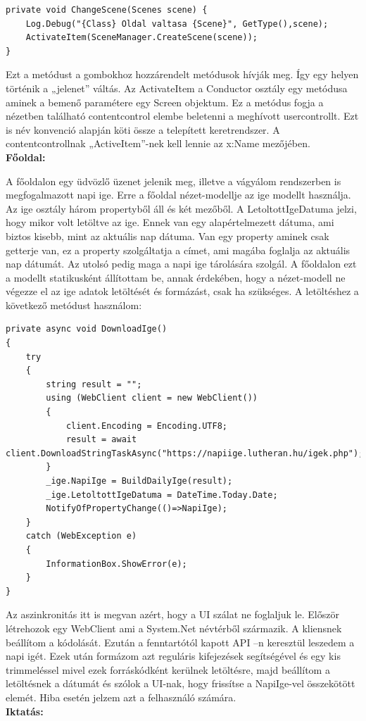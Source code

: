 \documentclass[
]{thesis-ekf}
\theoremstyle{definition}
\theoremstyle{remark}
\begin{document}
\begin{lstlisting}
private void ChangeScene(Scenes scene) {
	Log.Debug("{Class} Oldal valtasa {Scene}", GetType(),scene);
	ActivateItem(SceneManager.CreateScene(scene));
}
\end{lstlisting}
Ezt a metódust a gombokhoz hozzárendelt metódusok hívják meg. Így egy helyen történik a „jelenet” váltás. Az ActivateItem a Conductor osztály egy metódusa aminek a bemenő paramétere egy Screen objektum. Ez a metódus fogja a nézetben található contentcontrol elembe beletenni a meghívott usercontrollt. Ezt is név konvenció alapján köti össze a telepített keretrendszer. A contentcontrollnak „ActiveItem”-nek kell lennie az x:Name mezőjében.\\
\textbf{Főoldal:}

A főoldalon egy üdvözlő üzenet jelenik meg, illetve a vágyálom rendszerben is megfogalmazott napi ige. Erre a főoldal nézet-modellje az ige modellt használja. Az ige osztály három propertyből áll és két mezőből. A LetoltottIgeDatuma jelzi, hogy mikor volt letöltve az ige. Ennek van egy alapértelmezett dátuma, ami biztos kisebb, mint az aktuális nap dátuma. Van egy property aminek csak getterje van, ez a property szolgáltatja a címet, ami magába foglalja az aktuális nap dátumát. Az utolsó pedig maga a napi ige tárolására szolgál. A főoldalon ezt a modellt statikusként állítottam be, annak érdekében, hogy a nézet-modell ne végezze el az ige adatok letöltését és formázást, csak ha szükséges. A letöltéshez a következő metódust használom:
\begin{lstlisting}
private async void DownloadIge()
{
	try
	{
		string result = "";
		using (WebClient client = new WebClient())
		{
			client.Encoding = Encoding.UTF8;
			result = await client.DownloadStringTaskAsync("https://napiige.lutheran.hu/igek.php");
		}
		_ige.NapiIge = BuildDailyIge(result);
		_ige.LetoltottIgeDatuma = DateTime.Today.Date;
		NotifyOfPropertyChange(()=>NapiIge);
	}
	catch (WebException e)
	{
		InformationBox.ShowError(e);
	}
}
\end{lstlisting}
Az aszinkronitás itt is megvan  azért, hogy a UI szálat ne foglaljuk le. Először létrehozok egy WebClient ami a System.Net névtérből származik. A kliensnek beállítom a kódolását. Ezután a fenntartótól kapott API –n keresztül leszedem a napi igét. Ezek után formázom azt reguláris kifejezések segítségével és egy kis trimmeléssel mivel ezek forráskódként kerülnek letöltésre, majd beállítom a letöltésnek a dátumát és szólok a UI-nak, hogy frissítse a NapiIge-vel összekötött elemét. Hiba esetén jelzem azt a felhasználó számára.\\
\textbf{Iktatás:}
\end{document}
